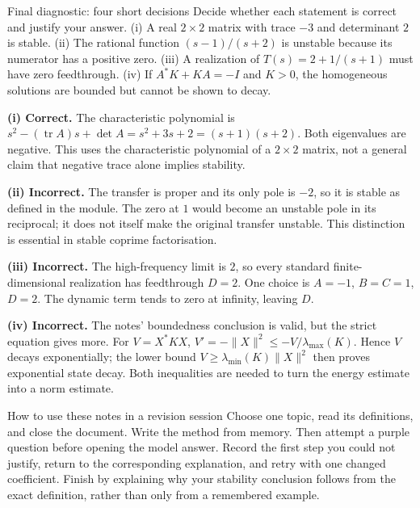 \begin{question}{Final diagnostic: four short decisions}
Decide whether each statement is correct and justify your answer. (i) A real $2\times2$ matrix with trace $-3$ and determinant $2$ is stable. (ii) The rational function $(s-1)/(s+2)$ is unstable because its numerator has a positive zero. (iii) A realization of $T(s)=2+1/(s+1)$ must have zero feedthrough. (iv) If $A^*K+KA=-I$ and $K>0$, the homogeneous solutions are bounded but cannot be shown to decay.
\end{question}
\begin{answer}
\textbf{(i) Correct.} The characteristic polynomial is $s^2-(\operatorname{tr}A)s+\det A=s^2+3s+2=(s+1)(s+2)$. Both eigenvalues are negative. This uses the characteristic polynomial of a $2\times2$ matrix, not a general claim that negative trace alone implies stability.

\textbf{(ii) Incorrect.} The transfer is proper and its only pole is $-2$, so it is stable as defined in the module. The zero at $1$ would become an unstable pole in its reciprocal; it does not itself make the original transfer unstable. This distinction is essential in stable coprime factorisation.

\textbf{(iii) Incorrect.} The high-frequency limit is $2$, so every standard finite-dimensional realization has feedthrough $D=2$. One choice is $A=-1$, $B=C=1$, $D=2$. The dynamic term tends to zero at infinity, leaving $D$.

\textbf{(iv) Incorrect.} The notes' boundedness conclusion is valid, but the strict equation gives more. For $V=X^*KX$, $V'=-\|X\|^2\leq-V/\lambda_{\max}(K)$. Hence $V$ decays exponentially; the lower bound $V\geq\lambda_{\min}(K)\|X\|^2$ then proves exponential state decay. Both inequalities are needed to turn the energy estimate into a norm estimate.
\end{answer}
\begin{method}{How to use these notes in a revision session}
Choose one topic, read its definitions, and close the document. Write the method from memory. Then attempt a purple question before opening the model answer. Record the first step you could not justify, return to the corresponding explanation, and retry with one changed coefficient. Finish by explaining why your stability conclusion follows from the exact definition, rather than only from a remembered example.
\end{method}


